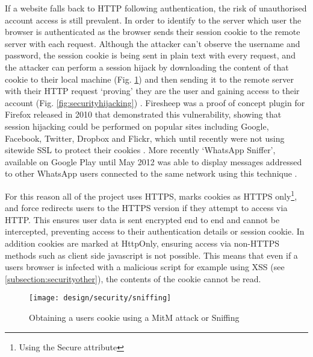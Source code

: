 If a website falls back to HTTP following authentication, the risk of unauthorised account access is still prevalent.
%
In order to identify to the server which user the browser is authenticated as the browser sends their session cookie to the remote server with each request. 
%
Although the attacker can't observe the username and password, the session cookie is being sent in plain text with every request, and the attacker can perform a session hijack by downloading the content of that cookie to their local machine (Fig. \ref{fig:securitysniffing}) and then sending it to the remote server with their HTTP request `proving' they are the user and gaining access to their account (Fig. \ref{fig:securityhijacking}) \parencite{owasp2011sessionhihacking}.
% 
Firesheep was a proof of concept plugin for Firefox released in 2010 that demonstrated this vulnerability, showing that session hijacking could be performed on popular sites including Google, Facebook, Twitter, Dropbox and Flickr, which until recently were not using sitewide SSL to protect their cookies \parencite{butler2010firesheep, butler2014firesheep}. 
%
More recently `WhatsApp Sniffer', available on Google Play until May 2012 was able to display messages addressed to other WhatsApp users connected to the same network using this technique \parencite{thehsecurity2012whatsapp}.

For this reason all of the project uses HTTPS, marks cookies as HTTPS only\footnote{Using the Secure attribute}, and force redirects users to the HTTPS version if they attempt to access via HTTP. This ensures user data is sent encrypted end to end and cannot be intercepted, preventing access to their authentication details or session cookie.
%
In addition cookies are marked at HttpOnly, ensuring access via non-HTTPS methods such as client side javascript is not possible. This means that even if a users browser is infected with a malicious script for example using XSS (see \ref{subsection:securityother}), the contents of the cookie cannot be read.

\begin{figure}[h]
    \centering
    \texttt{[image: design/security/sniffing]}
    \caption[Obtaining a users cookie using a MitM attack or sniffing]{Obtaining a users cookie using a MitM attack or Sniffing \parencite{owasp2011sessionhihacking}}
    \label{fig:securitysniffing}
\end{figure}

